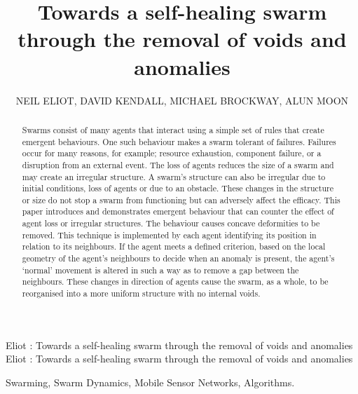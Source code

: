 \documentclass{ieeeaccess}
\begin{document}
\title{Towards a self-healing swarm through the removal of voids and anomalies}
\author{\uppercase{Neil Eliot},
\uppercase{David Kendall, Michael Brockway, Alun Moon}}
\address[1]{Northumbria University, Department of Computing and Information Sciences, Newcastle upon Tyne, NE1 8ST}
\markboth
{Eliot \headeretal: Towards a self-healing swarm through the removal of voids and anomalies}
{Eliot \headeretal: Towards a self-healing swarm through the removal of voids and anomalies}
\begin{abstract}
Swarms consist of many agents that interact using a simple set of rules that create emergent behaviours. One such behaviour makes a swarm tolerant of failures. Failures occur for many reasons, for example; resource exhaustion, component failure, or a disruption from an external event. The loss of agents reduces the size of a swarm and may create an irregular structure. A swarm's structure can also be irregular due to initial conditions, loss of agents or due to an obstacle. These changes in the structure or size do not stop a swarm from functioning but can adversely affect the efficacy. This paper introduces and demonstrates emergent behaviour that can counter the effect of agent loss or irregular structures. The behaviour causes concave deformities to be removed. This technique is implemented by each agent identifying its position in relation to its neighbours. If the agent meets a defined criterion, based on the local geometry of the agent's neighbours to decide when an anomaly is present, the agent's `normal' movement is altered in such a way as to remove a gap between the neighbours. These changes in direction of agents cause the swarm, as a whole, to be reorganised into a more uniform structure with no internal voids.
\end{abstract}
\begin{IEEEkeywords}
Swarming, Swarm Dynamics, Mobile Sensor Networks, Algorithms.
\end{IEEEkeywords}
\titlepgskip=-15pt
\maketitle
\end{document}
